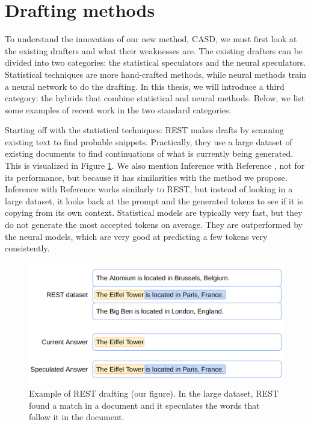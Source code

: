 \section{Drafting methods}
\label{sec:drafting_methods}
To understand the innovation of our new method, CASD, we must first look at the existing drafters and what their weaknesses are. The existing drafters can be divided into two categories: the statistical speculators and the neural speculators. Statistical techniques are more hand-crafted methods, while neural methods train a neural network to do the drafting. In this thesis, we will introduce a third category: the hybrids that combine statistical and neural methods. Below, we list some examples of recent work in the two standard categories.

Starting off with the statistical techniques: REST \cite{he2023rest} makes drafts by scanning existing text to find probable snippets. Practically, they use a large dataset of existing documents to find continuations of what is currently being generated. This is visualized in Figure \ref{fig:spec_dec_rest}. We also mention Inference with Reference \cite{yang2023inference}, not for its performance, but because it has similarities with the method we propose. Inference with Reference works similarly to REST, but instead of looking in a large dataset, it looks back at the prompt and the generated tokens to see if it is copying from its own context. Statistical models are typically very fast, but they do not generate the most accepted tokens on average. They are outperformed by the neural models, which are very good at predicting a few tokens very consistently. 

\begin{figure}[h]
	\centering
	\includegraphics[width=0.7\linewidth]{fig/spec_dec_rest.png}
	\caption{Example of REST \cite{he2023rest} drafting (our figure). In the large dataset, REST found a match in a document and it speculates the words that follow it in the document.}
	\label{fig:spec_dec_rest}
\end{figure}

